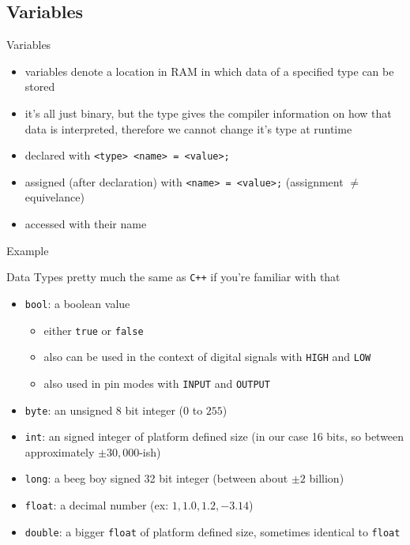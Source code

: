 \documentclass{beamer}
\newcommand{\cxx}{\texttt{C++}\xspace}
\newcommand{\examplefile}[1]{
	
}
\begin{document}
	\subsection{Variables}
	\begin{frame}[fragile]{Variables}
		\begin{itemize}
			\item variables denote a location in RAM in which data of a specified type can be stored
			\item it's all just binary, but the type gives the compiler information on how that data is interpreted, therefore we cannot change it's type at runtime
			\item declared with \verb|<type> <name> = <value>;|
			\item assigned (after declaration) with \verb|<name> = <value>;| (assignment $\neq$ equivelance)
			\item accessed with their name
		\end{itemize}
	\end{frame}

	\begin{frame}[fragile]{Example}
		\examplefile{variables.cxx}
	\end{frame}

	\begin{frame}[fragile]{Data Types}
		pretty much the same as \cxx if you're familiar with that
		\begin{itemize}
			\item \verb|bool|: a boolean value
			\begin{itemize}
				\item either \verb|true| or \verb|false|
				\item also can be used in the context of digital signals with \verb|HIGH| and \verb|LOW|
				\item also used in pin modes with \verb|INPUT| and \verb|OUTPUT|
			\end{itemize}

			\item \verb|byte|: an unsigned 8 bit integer ($0$ to $255$)
			\item \verb|int|: an signed integer of platform defined size (in our case 16 bits, so between approximately $\pm30,000$-ish)
			\item \verb|long|: a beeg boy signed 32 bit integer (between about $\pm2$ billion)
			\item \verb|float|: a decimal number (ex: $1, 1.0, 1.2, -3.14$)
			\item \verb|double|: a bigger \verb|float| of platform defined size, sometimes identical to \verb|float|
		\end{itemize}
	\end{frame}
\end{document}
